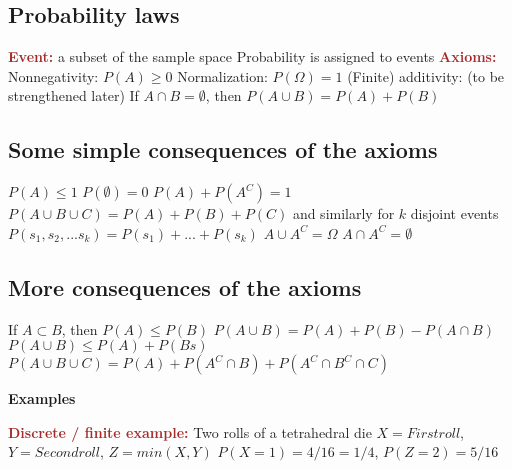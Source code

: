 {{{{%
\subsection{Probability laws}
\begin{outline}
\1 \textbf{\textcolor{brown}{Event:}} a subset of the sample space
  \2 Probability is assigned to events
\1 \textbf{\textcolor{brown}{Axioms:}}
  \2 Nonnegativity: $P(A) \geq 0$
  \2 Normalization: $P(\Omega) = 1$
  \2 (Finite) additivity: (to be strengthened later)
    \3 If $A \cap B = \emptyset$, then $P(A \cup B) = P(A) + P(B)$
\end{outline}

\subsection{Some simple consequences of the axioms}
\begin{outline}
\1 $P(A) \leq 1$
\1 $P(\emptyset) = 0$
\1 $P(A) + P(A^C)  = 1$
\1 $P(A \cup B \cup C) = P(A) + P(B) + P(C)$ and similarly for $k$ disjoint events $P({s_1, s_2, ... s_k}) = P(s_1) + ... + P(s_k)$
\1 $A \cup A^C = \Omega$
\1 $A \cap A^C = \emptyset$
\end{outline}

\subsection{More consequences of the axioms}
\begin{outline}
\1 If $A \subset B$, then $P(A) \leq P(B)$
\1 $P(A \cup B) = P(A) + P(B) - P(A \cap B)$
\1 $P(A \cup B) \leq P(A) + P(Bs)$
\1 $P(A \cup B \cup C) = P(A) + P(A^C \cap B) + P(A^C \cap B^C \cap C)$
\end{outline}

\textbf{Examples}
\begin{outline}
\1 \textbf{\textcolor{brown}{Discrete / finite example:}} Two rolls of a tetrahedral die
  \2 $X = First roll$, $Y = Second roll$, $Z = min(X,Y)$
  \2 $P(X=1) = 4/16 = 1/4$, $P(Z=2)=5/16$
\end{outline}

}}}}
